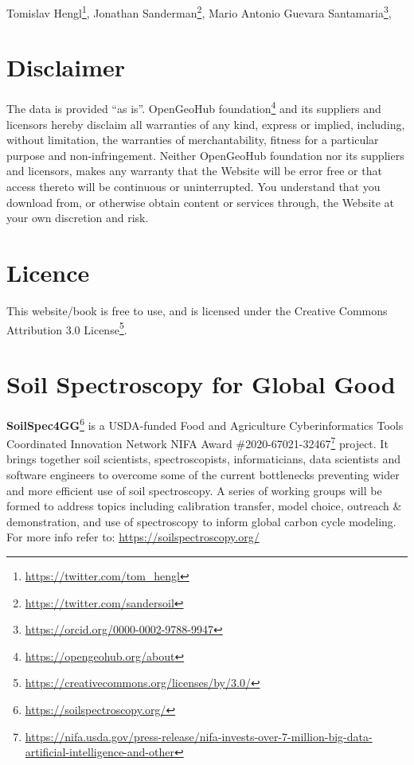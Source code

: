\documentclass[
  graybox,natbib,nospthms]{svmono}
\renewcommand{\href}[2]{#2 (\url{#1})}
\renewcommand{\href}[2]{#2\footnote{\url{#1}}}
\begin{document}
\href{https://twitter.com/tom_hengl}{Tomislav Hengl}, \href{https://twitter.com/sandersoil}{Jonathan Sanderman}, \href{https://orcid.org/0000-0002-9788-9947}{Mario Antonio Guevara
Santamaria},

\hypertarget{disclaimer}{%
\section{Disclaimer}\label{disclaimer}}

The data is provided ``as is''. \href{https://opengeohub.org/about}{OpenGeoHub foundation} and its suppliers and licensors hereby disclaim all warranties of any kind, express or implied, including, without limitation, the warranties of merchantability, fitness for a particular purpose and non-infringement. Neither OpenGeoHub foundation nor its suppliers and licensors, makes any warranty that the Website will be error free or that access thereto will be continuous or uninterrupted. You understand that you download from, or otherwise obtain content or services through, the Website at your own discretion and risk.

\hypertarget{licence}{%
\section{Licence}\label{licence}}

This website/book is free to use, and is licensed under the \href{https://creativecommons.org/licenses/by/3.0/}{Creative
Commons Attribution 3.0
License}.

\hypertarget{soil-spectroscopy-for-global-good}{%
\section{Soil Spectroscopy for Global Good}\label{soil-spectroscopy-for-global-good}}

\href{https://soilspectroscopy.org/}{\textbf{SoilSpec4GG}} is a USDA-funded \href{https://nifa.usda.gov/press-release/nifa-invests-over-7-million-big-data-artificial-intelligence-and-other}{Food and Agriculture Cyberinformatics
Tools Coordinated Innovation Network NIFA Award \#2020-67021-32467} project. It brings together soil
scientists, spectroscopists, informaticians, data scientists and
software engineers to overcome some of the current bottlenecks
preventing wider and more efficient use of soil spectroscopy. A series
of working groups will be formed to address topics including calibration
transfer, model choice, outreach \& demonstration, and use of
spectroscopy to inform global carbon cycle modeling. For more info refer
to: \url{https://soilspectroscopy.org/}
\end{document}
